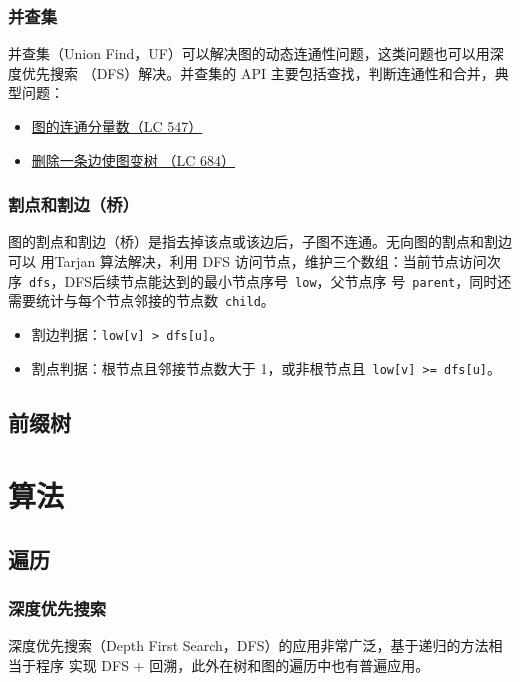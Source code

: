 \subsection{并查集}
并查集（Union Find，UF）可以解决图的动态连通性问题，这类问题也可以用深度优先搜索
（DFS）解决。并查集的 API 主要包括查找，判断连通性和合并，典型问题：

\begin{itemize}
  \item 
    \href{https://leetcode.com/problems/friend-circles}{图的连通分量数（LC 547）}
  \item
    \href{https://leetcode.com/problems/redundant-connection}{删除一条边使图变树
      （LC 684）}
\end{itemize}

\subsection{割点和割边（桥）}
图的割点和割边（桥）是指去掉该点或该边后，子图不连通。无向图的割点和割边可以
用Tarjan 算法解决，利用 DFS 访问节点，维护三个数组：当前节点访问次
序~\texttt{dfs}，DFS后续节点能达到的最小节点序号~\texttt{low}，父节点序
号~\texttt{parent}，同时还需要统计与每个节点邻接的节点数~\texttt{child}。

\begin{itemize}
  \item 割边判据：\texttt{low[v] > dfs[u]}。
  \item 割点判据：根节点且邻接节点数大于 1，或非根节点且~\texttt{low[v] >= dfs[u]}。
\end{itemize}

\section{前缀树}

\chapter{算法}
\section{遍历}
\subsection{深度优先搜索}
深度优先搜索（Depth First Search，DFS）的应用非常广泛，基于递归的方法相当于程序
实现 DFS + 回溯，此外在树和图的遍历中也有普遍应用。


